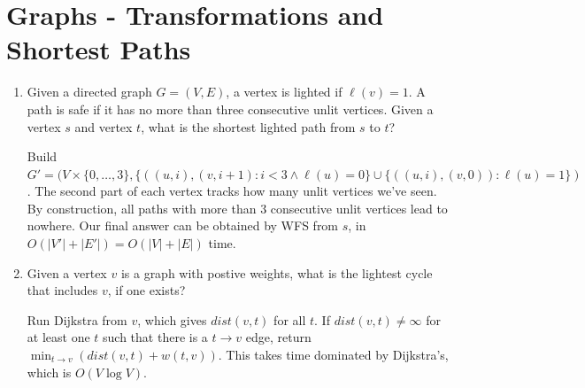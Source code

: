 \documentclass[fleqn]{article}
\begin{document}
\section{Graphs - Transformations and Shortest Paths}
\begin{enumerate}
    \item Given a directed graph $G = (V, E)$, a vertex is lighted if $\ell(v) = 1$. A path is safe if it has no more than three consecutive unlit vertices. Given a vertex $s$ and vertex $t$, what is the shortest lighted path from $s$ to $t$?
    \begin{answer}
        Build $G' = (V \times \{0,\dots,3\}, \{((u,i), (v,i+1) : i < 3 \wedge \ell(u) = 0\} \cup \{((u,i), (v,0)) : \ell(u) = 1\})$.
        The second part of each vertex tracks how many unlit vertices we've seen. By construction, all paths with more than $3$ consecutive unlit vertices lead to nowhere. Our final answer can be obtained by WFS from $s$, in $O(|V'| + |E'|) = O(|V| + |E|)$ time.
    \end{answer}
    \item Given a vertex $v$ is a graph with postive weights, what is the lightest cycle that includes $v$, if one exists?
    \begin{answer}
        Run Dijkstra from $v$, which gives $dist(v,t)$ for all $t$. If $dist(v,t) \neq \infty$ for at least one $t$ such that there is a $t \to v$ edge, return $\min_{t \to v}(dist(v,t) + w(t,v))$. This takes time dominated by Dijkstra's, which is $O(V\log V)$.
    \end{answer}
\end{enumerate}
\end{document}

